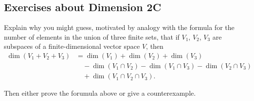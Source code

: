 \subsection*{Exercises about Dimension 2C}

\setcounter{xrcs}{19}
\begin{xrcs}
  Explain why you might guess, motivated by analogy with the formula for the number of elements in the union of three finite sets, that if $V_1$, $V_2$, $V_3$ are subspaces of a finite-dimensional vector space $V$, then
  \[
    \begin{aligned}
      \dim (V_1 + V_2 + V_3) &= \dim (V_1) + \dim (V_2) + \dim (V_3) \\
      & \quad - \dim(V_1 \cap V_2) - \dim (V_1 \cap V_3) - \dim (V_2 \cap V_3) \\
      & \quad + \dim (V_1 \cap V_2 \cap V_3).
    \end{aligned}
  \]

  Then either prove the forumula above or give a counterexample.


\end{xrcs}

